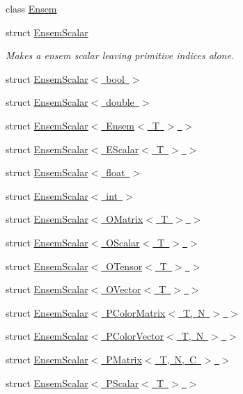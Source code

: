 \begin{DoxyCompactItemize}
class \mbox{\hyperlink{classENSEM_1_1Ensem}{Ensem}}
\item 
struct \mbox{\hyperlink{structENSEM_1_1EnsemScalar}{Ensem\+Scalar}}
\begin{DoxyCompactList}\small\item\em Makes a ensem scalar leaving primitive indices alone. \end{DoxyCompactList}\item 
struct \mbox{\hyperlink{structENSEM_1_1EnsemScalar_3_01bool_01_4}{Ensem\+Scalar$<$ bool $>$}}
\item 
struct \mbox{\hyperlink{structENSEM_1_1EnsemScalar_3_01double_01_4}{Ensem\+Scalar$<$ double $>$}}
\item 
struct \mbox{\hyperlink{structENSEM_1_1EnsemScalar_3_01Ensem_3_01T_01_4_01_4}{Ensem\+Scalar$<$ Ensem$<$ T $>$ $>$}}
\item 
struct \mbox{\hyperlink{structENSEM_1_1EnsemScalar_3_01EScalar_3_01T_01_4_01_4}{Ensem\+Scalar$<$ E\+Scalar$<$ T $>$ $>$}}
\item 
struct \mbox{\hyperlink{structENSEM_1_1EnsemScalar_3_01float_01_4}{Ensem\+Scalar$<$ float $>$}}
\item 
struct \mbox{\hyperlink{structENSEM_1_1EnsemScalar_3_01int_01_4}{Ensem\+Scalar$<$ int $>$}}
\item 
struct \mbox{\hyperlink{structENSEM_1_1EnsemScalar_3_01OMatrix_3_01T_01_4_01_4}{Ensem\+Scalar$<$ O\+Matrix$<$ T $>$ $>$}}
\item 
struct \mbox{\hyperlink{structENSEM_1_1EnsemScalar_3_01OScalar_3_01T_01_4_01_4}{Ensem\+Scalar$<$ O\+Scalar$<$ T $>$ $>$}}
\item 
struct \mbox{\hyperlink{structENSEM_1_1EnsemScalar_3_01OTensor_3_01T_01_4_01_4}{Ensem\+Scalar$<$ O\+Tensor$<$ T $>$ $>$}}
\item 
struct \mbox{\hyperlink{structENSEM_1_1EnsemScalar_3_01OVector_3_01T_01_4_01_4}{Ensem\+Scalar$<$ O\+Vector$<$ T $>$ $>$}}
\item 
struct \mbox{\hyperlink{structENSEM_1_1EnsemScalar_3_01PColorMatrix_3_01T_00_01N_01_4_01_4}{Ensem\+Scalar$<$ P\+Color\+Matrix$<$ T, N $>$ $>$}}
\item 
struct \mbox{\hyperlink{structENSEM_1_1EnsemScalar_3_01PColorVector_3_01T_00_01N_01_4_01_4}{Ensem\+Scalar$<$ P\+Color\+Vector$<$ T, N $>$ $>$}}
\item 
struct \mbox{\hyperlink{structENSEM_1_1EnsemScalar_3_01PMatrix_3_01T_00_01N_00_01C_01_4_01_4}{Ensem\+Scalar$<$ P\+Matrix$<$ T, N, C $>$ $>$}}
\item 
struct \mbox{\hyperlink{structENSEM_1_1EnsemScalar_3_01PScalar_3_01T_01_4_01_4}{Ensem\+Scalar$<$ P\+Scalar$<$ T $>$ $>$}}

\end{DoxyCompactItemize}
